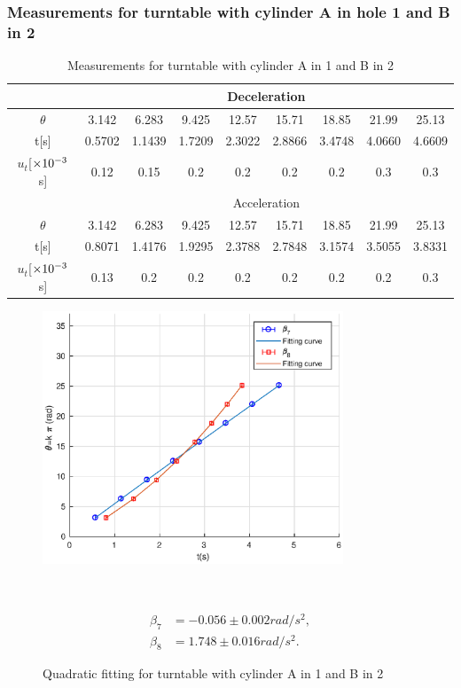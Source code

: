 \subsubsection{Measurements for turntable with cylinder A in hole 1 and B in 2}
    \begin{table}[H] \small
        \centering
        \begin{tabular}{|c|c|c|c|c|c|c|c|c|}
            \hline
            & \multicolumn{8}{c|}{Deceleration} \\\hline
            $\theta$ & 3.142 & 6.283 & 9.425 & 12.57 & 15.71 & 18.85 & 21.99 & 25.13\\\hline
            t[s] & 0.5702 & 1.1439 & 1.7209 & 2.3022 & 2.8866 & 3.4748 & 4.0660 & 4.6609\\\hline
            $u_t$[$\times10^{-3}$s] & 0.12 & 0.15 & 0.2 & 0.2 & 0.2 & 0.2 & 0.3 & 0.3\\\hline
            & \multicolumn{8}{c|}{Acceleration} \\\hline
            $\theta$ & 3.142 & 6.283 & 9.425 & 12.57 & 15.71 & 18.85 & 21.99 & 25.13\\\hline
            t[s] & 0.8071 & 1.4176 & 1.9295 & 2.3788 & 2.7848 & 3.1574 & 3.5055 & 3.8331\\\hline
            $u_t$[$\times10^{-3}$s] & 0.13 & 0.2 & 0.2 & 0.2 & 0.2 & 0.2 & 0.2 & 0.3\\\hline
        \end{tabular}
        \caption{Measurements for turntable with cylinder A in 1 and B in 2}\label{data_4}
    \end{table}

    \begin{figure}[H]
    \centering
    \begin{minipage}{0.6\textwidth}    
        \includegraphics[width=0.8\textwidth]{images/4}
        \caption{Quadratic fitting for turntable with cylinder A in 1 and B in 2}\label{fig_4}
    \end{minipage}
    ~
    \begin{minipage}{0.35\textwidth}
        \[
        \begin{split}
            \beta_7&=-0.056\pm 0.002rad/s^2,\\
            \beta_8&=1.748\pm 0.016rad/s^2.
        \end{split}
        \]
    \end{minipage}
    \end{figure}

